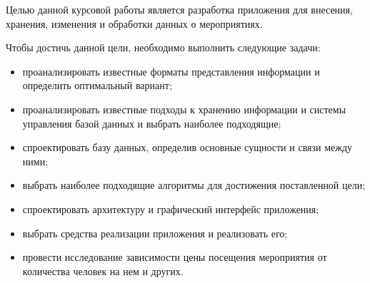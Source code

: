 
Целью данной курсовой работы является разработка приложения для внесения, хранения, изменения и обработки данных о мероприятиях. 

Чтобы достичь данной цели, необходимо выполнить следующие задачи:
\begin{itemize}[label=--]
	\item проанализировать известные форматы представления информации и определить оптимальный вариант;
	\item проанализировать известные подходы к хранению информации и системы управления базой данных и выбрать наиболее подходящие;
	\item спроектировать базу данных, определив основные сущности и связи между ними;
	\item выбрать наиболее подходящие алгоритмы для достижения поставленной цели;
	\item спроектировать архитектуру и графический интерфейс приложения;
	\item выбрать средства реализации приложения и реализовать его;
	\item провести исследование зависимости цены посещения мероприятия от количества человек на нем и других.
\end{itemize}

\clearpage
